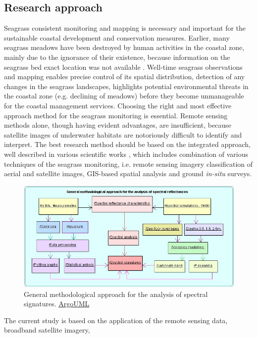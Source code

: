 \documentclass[10pt, a4paper]{article}
\begin{document}
\subsection{Research approach}
Seagrass consistent monitoring and mapping is necessary and important for the sustainable coastal
development and conservation measures. Earlier, many seagrass meadows have been destroyed by
human activities in the coastal zone, mainly due to the ignorance of their existence, because
information on the seagrass bed exact location was not available \cite{Choo06}\label{Choo06}. Well-time seagrass
observations and mapping enables precise control of its spatial distribution, detection of any changes
in the seagrass landscapes, highlights potential environmental threats in the coastal zone (e.g.
declining of meadows) before they become unmanageable for the coastal management services.
Choosing the right and most effective approach method for the seagrass monitoring is essential.
Remote sensing methods alone, though having evident advantages, are insufficient, because satellite
images of underwater habitats are notoriously difficult to identify and interpret. The best research
method should be based on the integrated approach, well described in various scientific works \cite{Brown02,Montefalcone06,Kirkman96}\label{Brown02} \label{Montefalcone06} \label{Kirkman96}, which includes combination of various
techniques of the seagrass monitoring, i.e. remote sensing imagery classification of aerial and satellite
images, GIS-based spatial analysis and ground \textit{in-situ} surveys.
\begin{figure}[H]
	\centering
	\includegraphics[scale=0.48]{UML_ClassDiagram.jpg}
	\caption{General methodological approach for the analysis of spectral signatures. \href{http://argouml.tigris.org/}{ArgoUML}}
	\label{fig:1.10}
\end{figure}
The current study is based on the application of the remote sensing data, broadband satellite imagery,
\end{document}
